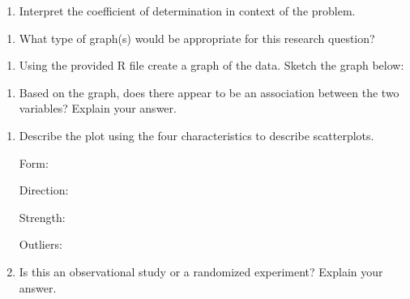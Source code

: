\documentclass[
]{report}
\providecommand{\tightlist}{%
  \setlength{\itemsep}{0pt}\setlength{\parskip}{0pt}}
\begin{document}
\vspace{0.2in}

\begin{enumerate}
\def\labelenumi{\alph{enumi}.}
\setcounter{enumi}{6}
\tightlist
\item
  Interpret the coefficient of determination in context of the problem.
\end{enumerate}

\vspace{0.3in}

\begin{enumerate}
\def\labelenumi{\alph{enumi}.}
\setcounter{enumi}{7}
\tightlist
\item
  What type of graph(s) would be appropriate for this research question?
\end{enumerate}

\newpage

\begin{enumerate}
\def\labelenumi{\roman{enumi}.}
\tightlist
\item
  Using the provided R file create a graph of the data. Sketch the graph below:
\end{enumerate}

\vspace{2in}

\begin{enumerate}
\def\labelenumi{\alph{enumi}.}
\setcounter{enumi}{9}
\tightlist
\item
  Based on the graph, does there appear to be an association between the two variables? Explain your answer.
\end{enumerate}

\vspace{0.8in}

\begin{enumerate}
\def\labelenumi{\alph{enumi}.}
\setcounter{enumi}{10}
\item
  Describe the plot using the four characteristics to describe scatterplots.
  \vspace{0.1in}

  Form:
  \vspace{0.2in}

  Direction:
  \vspace{0.2in}

  Strength:
  \vspace{0.2in}

  Outliers:
  \vspace{0.2in}
\item
  Is this an observational study or a randomized experiment? Explain your answer.
\end{enumerate}
\end{document}
